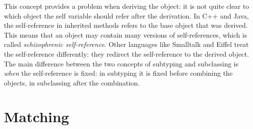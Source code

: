 This concept provides a problem when deriving the object: it is not
quite clear to which object the self variable should refer after the derivation.
In C++ and Java, the self-reference in inherited methods refers to the base
object that was derived. This means that an object may contain many versions
of self-references, which is called \emph{schizophrenic self-reference}. Other
languages like Smalltalk and Eiffel treat the self-reference differently: they
redirect the self-reference to the derived object. \\

The main difference between the two concepts of subtyping and subclassing is
\emph{when} the self-reference is fixed: in subtyping it is fixed before 
combining the objects, in subclassing after the combination.


\chapter{Matching}
